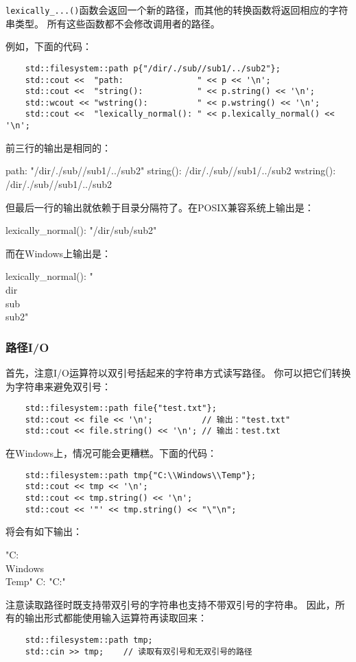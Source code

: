 \texttt{lexically\_...()}函数会返回一个新的路径，而其他的转换函数将返回相应的字符串类型。
所有这些函数都不会修改调用者的路径。

例如，下面的代码：
\begin{lstlisting}
    std::filesystem::path p{"/dir/./sub//sub1/../sub2"};
    std::cout <<  "path:               " << p << '\n';
    std::cout <<  "string():           " << p.string() << '\n';
    std::wcout << "wstring():          " << p.wstring() << '\n';
    std::cout <<  "lexically_normal(): " << p.lexically_normal() << '\n';
\end{lstlisting}
前三行的输出是相同的：
\begin{blacklisting}
    path:               "/dir/./sub//sub1/../sub2"
    string():           /dir/./sub//sub1/../sub2
    wstring():          /dir/./sub//sub1/../sub2
\end{blacklisting}
但最后一行的输出就依赖于目录分隔符了。在POSIX兼容系统上输出是：
\begin{blacklisting}
    lexically_normal(): "/dir/sub/sub2"
\end{blacklisting}
而在Windows上输出是：
\begin{blacklisting}
    lexically_normal(): "\\dir\\sub\\sub2"
\end{blacklisting}

\subsubsection{路径I/O}
首先，注意I/O运算符以双引号括起来的字符串方式读写路径。
你可以把它们转换为字符串来避免双引号：
\begin{lstlisting}
    std::filesystem::path file{"test.txt"};
    std::cout << file << '\n';          // 输出："test.txt"
    std::cout << file.string() << '\n'; // 输出：test.txt
\end{lstlisting}
在Windows上，情况可能会更糟糕。下面的代码：
\begin{lstlisting}
    std::filesystem::path tmp{"C:\\Windows\\Temp"};
    std::cout << tmp << '\n';
    std::cout << tmp.string() << '\n';
    std::cout << '"' << tmp.string() << "\"\n";
\end{lstlisting}
将会有如下输出：
\begin{blacklisting}
    "C:\\Windows\\Temp"
    C:\Windows\Temp
    "C:\Windows\Temp"
\end{blacklisting}
注意读取路径时既支持带双引号的字符串也支持不带双引号的字符串。
因此，所有的输出形式都能使用输入运算符再读取回来：
\begin{lstlisting}
    std::filesystem::path tmp;
    std::cin >> tmp;    // 读取有双引号和无双引号的路径
\end{lstlisting}

